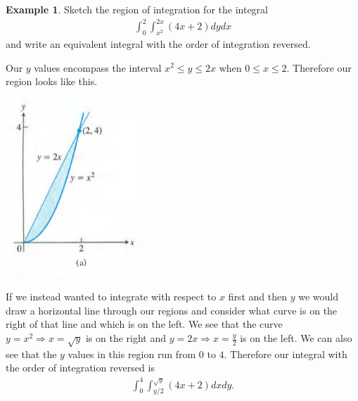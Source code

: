 \documentclass[12pt, letter]{article}
\theoremstyle{plain}
\numberwithin{theorem}{section}
\theoremstyle{definition}
\newtheorem{example}[theorem]{Example}
\begin{document}
\begin{example}
Sketch the region of integration for the integral
\begin{align*}
\int_0^2 \int_{x^2}^{2x} (4x+2) dy dx
\end{align*}
and write an equivalent integral with the order of integration reversed.

\bigskip

Our $y$ values encompass the interval $x^2\leq y \leq 2x$ when $0\leq x \leq 2$. Therefore our region looks like this.

\bigskip

\begin{center}
\includegraphics[scale=0.7]{m3_f4}
\end{center}

\bigskip

If we instead wanted to integrate with respect to $x$ first and then $y$ we would draw a horizontal line through our regions and consider what curve is on the right of that line and which is on the left. We see that the curve $y=x^2 \Rightarrow x=\sqrt{y}$ is on the right and $y=2x \Rightarrow x=\frac{y}{2}$ is on the left. We can also see that the $y$ values in this region run from $0$ to $4$. Therefore our integral with the order of integration reversed is
\begin{align*}
\int_0^4 \int_{y/2}^{\sqrt{y}} (4x+2)dxdy.
\end{align*}

\end{example}

\bigskip

\hrulefill

\bigskip
\end{document}
